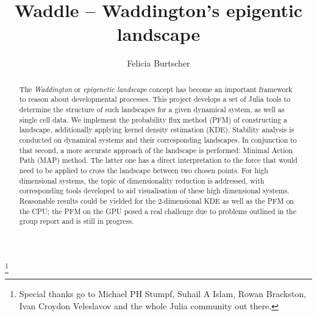 \documentclass[journal, a4paper]{IEEEtran}
\begin{document}
	\title{Waddle -- Waddington's epigentic landscape}
	\author{Felicia Burtscher}
	\thanks{Special thanks go to Michael PH Stumpf, Suhail A Islam, Rowan Brackston, Ivan Croydon Veleslavov and the whole Julia community out there.}\\
	
\maketitle


\begin{abstract}
The \textit{Waddington} or \textit{epigenetic landscape} concept has become an important framework to reason about developmental processes. This project develops a set of Julia tools to determine the structure of such landscapes for a given dynamical system, as well as single cell data. We implement the probability flux method (PFM) of constructing a landscape, additionally applying kernel density estimation (KDE). Stability analysis is conducted on dynamical systems and their corresponding landscapes. In conjunction to that second, a more accurate approach %
of the landscape is performed: Minimal Action Path (MAP) method. The latter one has a direct interpretation to the force that would need to be applied to cross the landscape between two chosen points. %
For high dimensional systems, the topic of dimensionality reduction is addressed, with corresponding tools developed to aid visualisation of these high dimensional systems. 
Reasonable results could be yielded for the 2-dimensional KDE as well as the PFM on the CPU; the PFM on the GPU posed a real challenge due to problems outlined in the group report and is still in progress.


\end{abstract}

\end{document}
